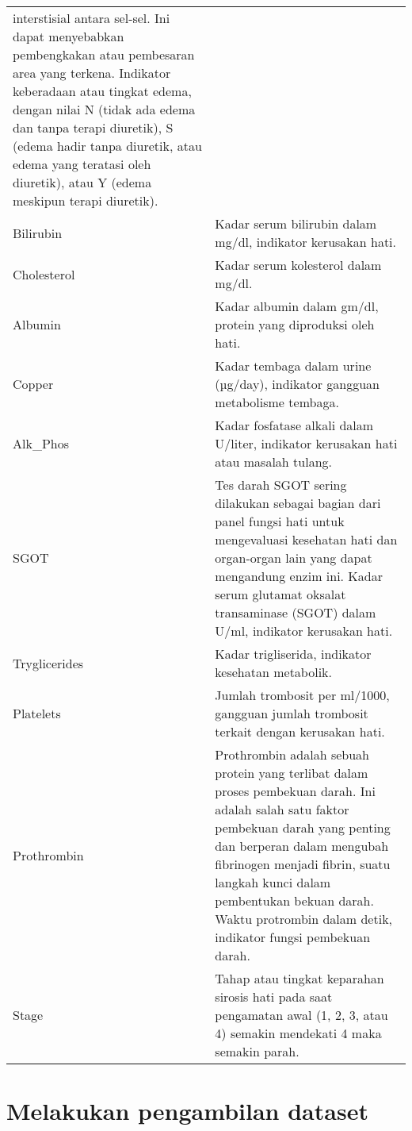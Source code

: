 \documentclass[
  letterpaper,
]{krantz}
\begin{document}
\begin{longtable}[]{@{}
  >{\raggedright\arraybackslash}p{}
  >{\raggedright\arraybackslash}p{}@{}}
interstisial antara sel-sel. Ini dapat menyebabkan pembengkakan atau
pembesaran area yang terkena. Indikator keberadaan atau tingkat edema,
dengan nilai N (tidak ada edema dan tanpa terapi diuretik), S (edema
hadir tanpa diuretik, atau edema yang teratasi oleh diuretik), atau Y
(edema meskipun terapi diuretik). \\
Bilirubin & Kadar serum bilirubin dalam mg/dl, indikator kerusakan
hati. \\
Cholesterol & Kadar serum kolesterol dalam mg/dl. \\
Albumin & Kadar albumin dalam gm/dl, protein yang diproduksi oleh
hati. \\
Copper & Kadar tembaga dalam urine (µg/day), indikator gangguan
metabolisme tembaga. \\
Alk\_Phos & Kadar fosfatase alkali dalam U/liter, indikator kerusakan
hati atau masalah tulang. \\
SGOT & Tes darah SGOT sering dilakukan sebagai bagian dari panel fungsi
hati untuk mengevaluasi kesehatan hati dan organ-organ lain yang dapat
mengandung enzim ini. Kadar serum glutamat oksalat transaminase (SGOT)
dalam U/ml, indikator kerusakan hati. \\
Tryglicerides & Kadar trigliserida, indikator kesehatan metabolik. \\
Platelets & Jumlah trombosit per ml/1000, gangguan jumlah trombosit
terkait dengan kerusakan hati. \\
Prothrombin & Prothrombin adalah sebuah protein yang terlibat dalam
proses pembekuan darah. Ini adalah salah satu faktor pembekuan darah
yang penting dan berperan dalam mengubah fibrinogen menjadi fibrin,
suatu langkah kunci dalam pembentukan bekuan darah. Waktu protrombin
dalam detik, indikator fungsi pembekuan darah. \\
Stage & Tahap atau tingkat keparahan sirosis hati pada saat pengamatan
awal (1, 2, 3, atau 4) semakin mendekati 4 maka semakin parah. \\
\end{longtable}

\hypertarget{melakukan-pengambilan-dataset}{%
\section*{Melakukan pengambilan
dataset}\label{melakukan-pengambilan-dataset}}

\end{document}
